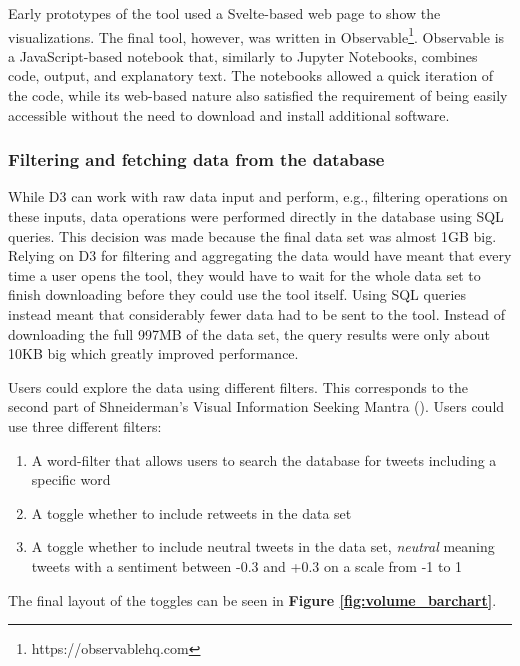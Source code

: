 Early prototypes of the tool used a Svelte-based web page to show the visualizations. The final tool, however, was written in Observable\footnote{https://observablehq.com}. Observable is a JavaScript-based notebook that, similarly to Jupyter Notebooks, combines code, output, and explanatory text. The notebooks allowed a quick iteration of the code, while its web-based nature also satisfied the requirement of being easily accessible without the need to download and install additional software.

\subsubsection{Filtering and fetching data from the database}
While D3 can work with raw data input and perform, e.g., filtering operations on these inputs, data operations were performed directly in the database using SQL queries. This decision was made because the final data set was almost 1GB big. Relying on D3 for filtering and aggregating the data would have meant that every time a user opens the tool, they would have to wait for the whole data set to finish downloading before they could use the tool itself. Using SQL queries instead meant that considerably fewer data had to be sent to the tool. Instead of downloading the full 997MB of the data set, the query results were only about 10KB big which greatly improved performance.

Users could explore the data using different filters. This corresponds to the second part of Shneiderman's Visual Information Seeking Mantra  (\cite[337]{shneidermanEyesHaveIt1996}). Users could use three different filters:

\begin{enumerate}
    \item A word-filter that allows users to search the database for tweets including a specific word
    \item A toggle whether to include retweets in the data set
    \item A toggle whether to include neutral tweets in the data set, \emph{neutral} meaning tweets with a sentiment between -0.3 and +0.3 on a scale from -1 to 1 %
\end{enumerate}

The final layout of the toggles can be seen in \textbf{Figure \ref{fig:volume_barchart}}.

